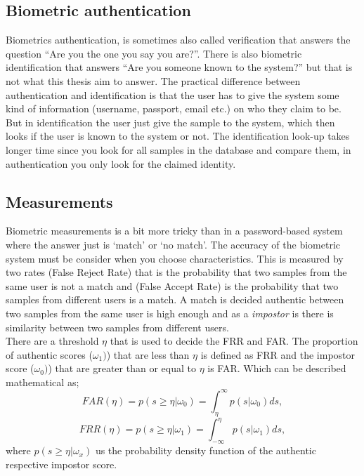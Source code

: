 \subsection{Biometric authentication}
Biometrics authentication, is sometimes also called verification that answers the question ``Are you the one you say you are?''. There is also biometric identification that answers ``Are you someone known to the system?'' but that is not what this thesis aim to answer. The practical difference between authentication and identification is that the user has to give the system some kind of information (username, passport, email etc.) on who they claim to be. But in identification the user just give the sample to the system, which then looks if the user is known to the system or not. The identification look-up takes longer time since you look for all samples in the database and compare them, in authentication you only look for the claimed identity. \cite[ch.~1]{introbio}

\subsection{Measurements}\label{sec:bio:measure}
Biometric measurements is a bit more tricky than in a password-based system where the answer just is `match' or `no match'. The accuracy of the biometric system must be consider when you choose characteristics. This is measured by two rates  (False Reject Rate) that is the probability that two samples from the same user is not a match and  (False Accept Rate) is the probability that two samples from different users is a match. A match is decided authentic between two samples from the same user is high enough and as a \textit{impostor} is there is similarity between two samples from different users.  \\
There are a threshold $\eta$ that is used to decide the FRR and FAR. The proportion of authentic scores ($\omega_{1})$) that are less than $\eta$ is defined as FRR and the impostor score ($\omega_{0})$) that are greater than or equal to $\eta$ is FAR. Which can be described mathematical as; 
$$ FAR(\eta) = p(s\geq \eta | \omega_{0}) = \int_{\eta}^{\infty} p(s | \omega_{0}) ds, $$
$$ FRR(\eta) = p(s\geq \eta | \omega_{1}) = \int_{-\infty}^{\eta} p(s | \omega_{1}) ds, $$
where $p(s\geq \eta | \omega_{x})$ us the probability density function of the authentic respective impostor score. 
\cite[p.~18]{introbio}

